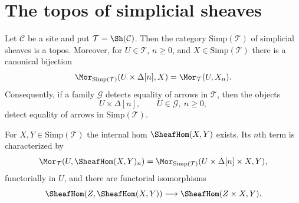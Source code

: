 
\section{The topos of simplicial sheaves}
\label{section-illusie-I-simplicial-topos}

\begin{lemma}
\label{lemma-illusie-I-simplicial-sheaves-topos}
Let $\mathcal{C}$ be a site and put $\mathcal{T} = \Sh(\mathcal{C})$.
Then the category $\text{Simp}(\mathcal{T})$ of simplicial sheaves is a
topos.  Moreover, for $U \in \mathcal{T}$, $n \geq 0$, and
$X \in \text{Simp}(\mathcal{T})$ there is a canonical bijection
$$
\Mor_{\text{Simp}(\mathcal{T})}(U \times \Delta[n], X)
=
\Mor_{\mathcal{T}}(U, X_n).
$$
Consequently, if a family $\mathcal{G}$ detects equality of arrows in
$\mathcal{T}$, then the objects
$$
U \times \Delta[n], \qquad U \in \mathcal{G},\ n \geq 0,
$$
detect equality of arrows in $\text{Simp}(\mathcal{T})$.

For $X,Y \in \text{Simp}(\mathcal{T})$ the internal hom
$\SheafHom(X,Y)$ exists.  Its $n$th term is characterized by
$$
\Mor_{\mathcal{T}}(U,\SheafHom(X,Y)_n)
=
\Mor_{\text{Simp}(\mathcal{T})}
(U \times \Delta[n] \times X,Y),
$$
functorially in $U$, and there are functorial isomorphisms
$$
\SheafHom(Z,\SheafHom(X,Y))
\longrightarrow
\SheafHom(Z \times X,Y).
$$
\end{lemma}


